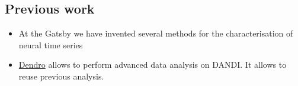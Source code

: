 \subsection{Previous work}

\begin{itemize}

    \item At the Gatsby we have invented several methods for the
        characterisation of neural time
        series~\citep[e.g.,][]{yuEtAl09,dunckerAndSahani18,ruttenEtAl20,yuEtAl24,buesingEtAl12a,buesingEtAl12b,mackeEtAl15,soulatEtAl21,walkerEtAl23,turnerAndSahani14,osheaEtAl22}

    \item \href{https://github.com/magland/dendro}{Dendro} allows to perform
        advanced data analysis on DANDI. It allows to reuse previous analysis.

\end{itemize}
